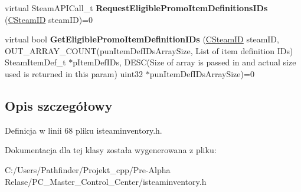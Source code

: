\begin{DoxyCompactItemize}
\item 
\mbox{\label{class_i_steam_inventory_a3dc3b836ba00239710c7b19d63717823}} 
virtual Steam\+A\+P\+I\+Call\+\_\+t {\bfseries Request\+Eligible\+Promo\+Item\+Definitions\+I\+Ds} (\hyperlink{class_c_steam_i_d}{C\+Steam\+ID} steam\+ID)=0
\item 
\mbox{\label{class_i_steam_inventory_a04a88553c0ef58b5bc713c68faa024dd}} 
virtual bool {\bfseries Get\+Eligible\+Promo\+Item\+Definition\+I\+Ds} (\hyperlink{class_c_steam_i_d}{C\+Steam\+ID} steam\+ID, O\+U\+T\+\_\+\+A\+R\+R\+A\+Y\+\_\+\+C\+O\+U\+NT(pun\+Item\+Def\+I\+Ds\+Array\+Size, List of item definition I\+Ds) Steam\+Item\+Def\+\_\+t $\ast$p\+Item\+Def\+I\+Ds, D\+E\+SC(Size of array is passed in and actual size used is returned in this param) uint32 $\ast$pun\+Item\+Def\+I\+Ds\+Array\+Size)=0
\end{DoxyCompactItemize}


\subsection{Opis szczegółowy}


Definicja w linii 68 pliku isteaminventory.\+h.



Dokumentacja dla tej klasy została wygenerowana z pliku\+:\begin{DoxyCompactItemize}
\item 
C\+:/\+Users/\+Pathfinder/\+Projekt\+\_\+cpp/\+Pre-\/\+Alpha Relase/\+P\+C\+\_\+\+Master\+\_\+\+Control\+\_\+\+Center/isteaminventory.\+h\end{DoxyCompactItemize}
